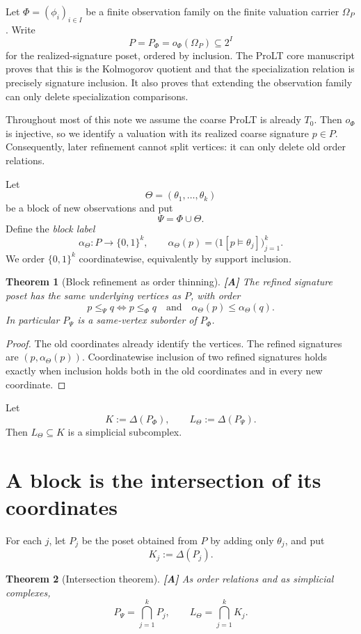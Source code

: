 \documentclass[11pt]{article}
\newtheorem{theorem}{Theorem}[section]
\theoremstyle{definition}
\newcommand{\Om}{\Omega_P}
\newcommand{\statusA}{\textbf{[A]}}
\begin{document}
Let $\Phi=(\phi_i)_{i\in I}$ be a finite observation family on the finite valuation carrier $\Om$. Write
\[
P=P_\Phi=o_\Phi(\Om)\subseteq 2^I
\]
for the realized-signature poset, ordered by inclusion. The ProLT core manuscript proves that this is the Kolmogorov quotient and that the specialization relation is precisely signature inclusion. It also proves that extending the observation family can only delete specialization comparisons.

Throughout most of this note we assume the coarse ProLT is already $T_0$. Then $o_\Phi$ is injective, so we identify a valuation with its realized coarse signature $p\in P$. Consequently, later refinement cannot split vertices: it can only delete old order relations.

Let
\[
\Theta=(\theta_1,\ldots,\theta_k)
\]
be a block of new observations and put
\[
\Psi=\Phi\cup\Theta.
\]
Define the \emph{block label}
\[
\alpha_\Theta:P\longrightarrow\{0,1\}^k,
\qquad
\alpha_\Theta(p)=\bigl(1[p\models\theta_j]\bigr)_{j=1}^k.
\]
We order $\{0,1\}^k$ coordinatewise, equivalently by support inclusion.

\begin{theorem}[Block refinement as order thinning]\label{thm:blockorder}
\statusA\;
The refined signature poset has the same underlying vertices as $P$, with order
\[
p\le_\Psi q
\iff
p\le_\Phi q\quad\text{and}\quad
\alpha_\Theta(p)\le\alpha_\Theta(q).
\]
In particular $P_\Psi$ is a same-vertex suborder of $P_\Phi$.
\end{theorem}

\begin{proof}
The old coordinates already identify the vertices. The refined signatures are $(p,\alpha_\Theta(p))$. Coordinatewise inclusion of two refined signatures holds exactly when inclusion holds both in the old coordinates and in every new coordinate.
\end{proof}

Let
\[
K:=\Delta(P_\Phi),
\qquad
L_\Theta:=\Delta(P_\Psi).
\]
Then $L_\Theta\subseteq K$ is a simplicial subcomplex.

\section{A block is the intersection of its coordinates}

For each $j$, let $P_j$ be the poset obtained from $P$ by adding only $\theta_j$, and put
\[
K_j:=\Delta(P_j).
\]

\begin{theorem}[Intersection theorem]\label{thm:intersection}
\statusA\;
As order relations and as simplicial complexes,
\[
P_\Psi=\bigcap_{j=1}^k P_j,
\qquad
L_\Theta=\bigcap_{j=1}^k K_j.
\]
\end{theorem}
\end{document}
